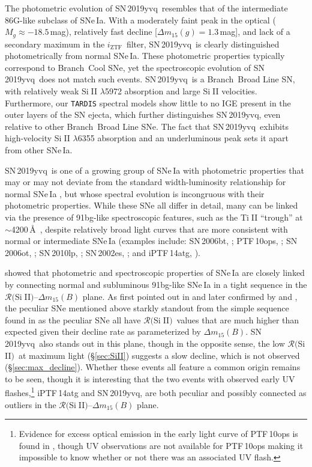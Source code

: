 \documentclass[twocolumn]{aastex63}
\def\ion#1#2{#1$\;${\footnotesize\rm{#2}}\relax}
\newcommand{\iztf}{$i_\mathrm{ZTF}$}
\newcommand{\RSiII}{$\mathcal{R}($\ion{Si}{II}$)$}
\newcommand{\sn}{SN\,2019yvq}
\begin{document}
The photometric evolution of \sn\ resembles that of the intermediate 86G-like
subclass of SNe\,Ia. With a moderately faint peak in the optical ($M_g \approx
-18.5$\,mag), relatively fast decline [$\Delta m_{15}(g) = 1.3$\,mag], and
lack of a secondary maximum in the \iztf\ filter, \sn\ is clearly
distinguished photometrically from normal SNe\,Ia. These photometric
properties typically correspond to Branch\ Cool SNe, yet the spectroscopic
evolution of \sn\ does not match such events. \sn\ is a Branch\ Broad Line SN,
with relatively weak \ion{Si}{II} $\lambda$5972 absorption and large
\ion{Si}{II} velocities. Furthermore, our \texttt{TARDIS} spectral models show
little to no IGE present in the outer layers of the SN ejecta, which further
distinguishes \sn, even relative to other Branch~Broad Line SNe. The fact that
\sn\ exhibits high-velocity \ion{Si}{II} $\lambda$6355 absorption and an
underluminous peak sets it apart from other SNe\,Ia.

\sn\ is one of a growing group of SNe\,Ia with photometric properties that may
or may not deviate from the standard width-luminosity relationship for normal
SNe\,Ia \citep[e.g.,][]{Phillips93,Phillips99}, but whose spectral evolution
is incongruous with their photometric properties. While these SNe all differ
in detail, many can be linked via the presence of 91bg-like spectroscopic
features, such as the \ion{Ti}{II} ``trough'' at $\sim$4200\,\AA\
\citep{Filippenko92,Leibundgut93}, despite relatively broad light curves that
are more consistent with normal or intermediate SNe\,Ia (examples include:
SN\,2006bt, \citealt{Foley10a}; PTF\,10ops, \citealt{Maguire11}; SN\,2006ot,
\citealt{Stritzinger11}; SN\,2010lp, \citealt{Kromer13a}; SN\,2002es,
\citealt{Ganeshalingam12}; and iPTF\,14atg, \citealt{Cao15}).

\citet{Benetti05} showed that photometric and spectroscopic properties of
SNe\,Ia are closely linked by connecting normal and subluminous 91bg-like
SNe\,Ia in a tight sequence in the \RSiII--$\Delta m_{15}(B)$ plane. As first
pointed out in \citet{Foley10a} and later confirmed by \citet{Maguire11} and
\citet{Ganeshalingam12}, the peculiar SNe mentioned above starkly standout
from the simple sequence found in \citet{Benetti05} as the peculiar SNe all
have \RSiII\ values that are much higher than expected given their decline
rate as parameterized by $\Delta m_{15}(B)$. \sn\ also stands out in this
plane, though in the opposite sense, the low \RSiII\ at maximum light
(\S\ref{sec:SiII}) suggests a slow decline, which is not observed
(\S\ref{sec:max_decline}). Whether these events all feature a common origin
remains to be seen, though it is interesting that the two events with observed
early UV flashes,\footnote{Evidence for excess optical emission in the early
light curve of PTF\,10ops is found in \citet{Jiang18}, though UV observations
are not available for PTF\,10ops making it impossible to know whether or not
there was an associated UV flash.} iPTF\,14atg and \sn, are both peculiar and
possibly connected as outliers in the \RSiII--$\Delta m_{15}(B)$ plane.
\end{document}
